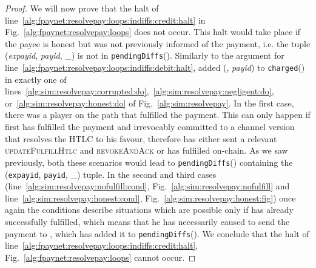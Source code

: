 \begin{proof}
  We will now prove that the halt of
  line~\ref{alg:fpaynet:resolvepay:loops:indiffs:credit:halt} in
  Fig.~\ref{alg:fpaynet:resolvepay:loops} does not occur. This halt would take
  place if the payee \bob{} is honest but was not previously informed of the
  payment, i.e. the tuple (\textit{expayid}, \textit{payid}, \_) is not in
  \texttt{pendingDiffs}(\bob). Similarly to the argument for
  line~\ref{alg:fpaynet:resolvepay:loops:indiffs:debit:halt}, \simulator{} added
  (\dave, \textit{payid}) to \texttt{charged}(\bob) in exactly one of
  lines~\ref{alg:sim:resolvepay:corrupted:do},~\ref{alg:sim:resolvepay:negligent:do},
  or~\ref{alg:sim:resolvepay:honest:do} of Fig.~\ref{alg:sim:resolvepay}. In the
  first case, there was a player on the path that fulfilled the payment. This
  can only happen if first \bob{} has fulfilled the payment and irrevocably
  committed to a channel version that resolves the HTLC to his favour, therefore
  \bob{} has either sent a relevant \textsc{updateFulfillHtlc} and
  \textsc{revokeAndAck} or has fulfilled on-chain. As we saw previously, both
  these scenarios would lead to \texttt{pendingDiffs}(\bob) containing the
  (\texttt{expayid}, \texttt{payid}, \_) tuple. In the second and third cases
  (line~\ref{alg:sim:resolvepay:nofulfill:cond},
  Fig.~\ref{alg:sim:resolvepay:nofulfill} and
  line~\ref{alg:sim:resolvepay:honest:cond},
  Fig.~\ref{alg:sim:resolvepay:honest:fig}) once again the conditions describe
  situations which are possible only if \bob{} has already successfully
  fulfilled, which means that he has necessarily caused \simulator{} to send the
  payment to \fpaynet{}, which has added it to \texttt{pendingDiffs}(\bob). We
  conclude that the halt of
  line~\ref{alg:fpaynet:resolvepay:loops:indiffs:credit:halt},
  Fig.~\ref{alg:fpaynet:resolvepay:loops} cannot occur.


\end{proof}
